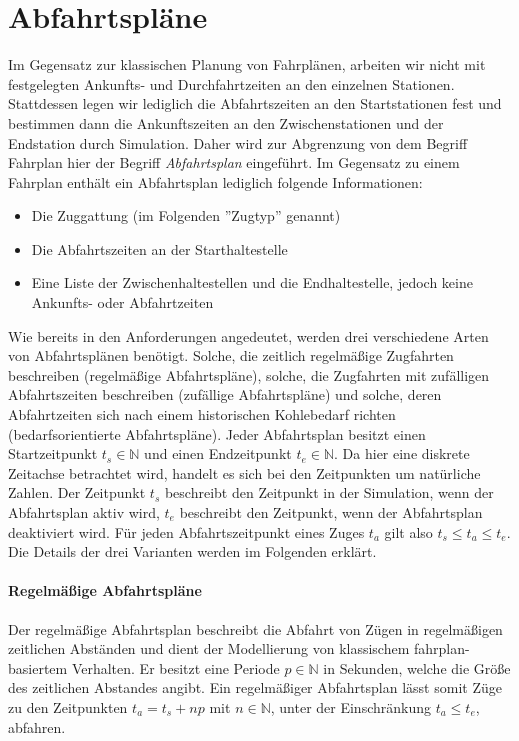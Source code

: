 \section{Abfahrtspläne}

Im Gegensatz zur klassischen Planung von Fahrplänen, arbeiten wir nicht mit festgelegten Ankunfts- und Durchfahrtzeiten an den einzelnen Stationen. Stattdessen legen wir lediglich die Abfahrtszeiten an den Startstationen fest und bestimmen dann die Ankunftszeiten an den Zwischenstationen und der Endstation durch Simulation. Daher wird zur Abgrenzung von dem Begriff Fahrplan hier der Begriff \emph{Abfahrtsplan} eingeführt. Im Gegensatz zu einem Fahrplan enthält ein Abfahrtsplan lediglich folgende Informationen:
\begin{itemize}
    \item Die Zuggattung (im Folgenden ''Zugtyp'' genannt)
    \item Die Abfahrtszeiten an der Starthaltestelle
    \item Eine Liste der Zwischenhaltestellen und die Endhaltestelle, jedoch keine Ankunfts- oder Abfahrtzeiten
\end{itemize}
 Wie bereits in den Anforderungen angedeutet, werden drei verschiedene Arten von Abfahrtsplänen benötigt. Solche, die zeitlich regelmäßige Zugfahrten beschreiben (regelmäßige Abfahrtspläne), solche, die Zugfahrten mit zufälligen Abfahrtszeiten beschreiben (zufällige Abfahrtspläne) und solche, deren Abfahrtzeiten sich nach einem historischen Kohlebedarf richten (bedarfsorientierte Abfahrtspläne). Jeder Abfahrtsplan besitzt einen Startzeitpunkt $t_s \in \mathbb{N}$ und einen Endzeitpunkt $t_e \in \mathbb{N}$. Da hier eine diskrete Zeitachse betrachtet wird, handelt es sich bei den Zeitpunkten um natürliche Zahlen. Der Zeitpunkt $t_s$ beschreibt den Zeitpunkt in der Simulation, wenn der Abfahrtsplan aktiv wird, $t_e$ beschreibt den Zeitpunkt, wenn der Abfahrtsplan deaktiviert wird. Für jeden Abfahrtszeitpunkt eines Zuges $t_a$ gilt also $t_s\leq t_a \leq t_e$. Die Details der drei Varianten werden im Folgenden erklärt.

\paragraph*{Regelmäßige Abfahrtspläne}

Der regelmäßige Abfahrtsplan beschreibt die Abfahrt von Zügen in regelmäßigen zeitlichen Abständen und dient der Modellierung von klassischem fahrplan-basiertem Verhalten. Er besitzt eine Periode $p\in\mathbb{N}$ in Sekunden, welche die Größe des zeitlichen Abstandes angibt. Ein regelmäßiger Abfahrtsplan lässt somit Züge zu den Zeitpunkten $t_a=t_s+np$ mit $n\in\mathbb{N}$, unter der Einschränkung $t_a\leq t_e$, abfahren.

